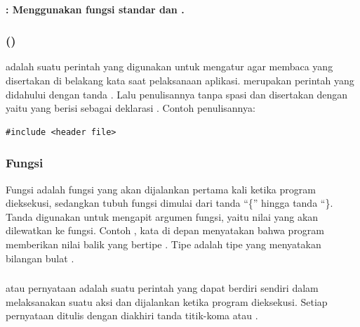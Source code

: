 \documentclass[../main.tex]{subfiles}
\begin{document}
\paragraph{	: Menggunakan fungsi standar {\ioi} dan {\ioo} {\stream}.}

\subsubsection{{\Preprocessor} {\directive} ()}

\begin{indentpar}\hpar{}
    {\Preprocessor} {\directive} adalah suatu perintah yang digunakan untuk mengatur {\compiler} agar membaca {\header} {\file} yang disertakan di belakang kata  saat pelaksanaan aplikasi. {\Preprocessor} {\directive} merupakan perintah yang didahului dengan tanda \citecode{\#}. Lalu penulisannya tanpa spasi dan disertakan dengan {\header} {\file} yaitu {\file} yang berisi sebagai {\file} deklarasi \parencite{kadir2005heriyanto}. Contoh penulisannya:
\end{indentpar}

\begin{code}[n]
\begin{verbatim}
#include <header file>
\end{verbatim}
\end{code}

\subsubsection{Fungsi }
\begin{indentpar}\hpar{}
    Fungsi  adalah fungsi yang akan dijalankan pertama kali ketika program dieksekusi, sedangkan tubuh fungsi dimulai dari tanda “\{” hingga tanda “\}. Tanda \citecode{()} digunakan untuk mengapit argumen fungsi, yaitu nilai yang akan dilewatkan ke fungsi. Contoh , kata  di depan  menyatakan bahwa program memberikan nilai balik yang bertipe . Tipe  adalah tipe yang menyatakan bilangan bulat \parencite{kadir2005heriyanto}.
\end{indentpar}

\subsubsection{{\Statement}}
\begin{indentpar}\hpar{}
    {\Statement} atau pernyataan adalah suatu perintah yang dapat berdiri sendiri dalam melaksanakan suatu aksi dan dijalankan ketika program dieksekusi. Setiap pernyataan ditulis dengan diakhiri tanda titik-koma atau {\semicolon} \citecode{;} \parencite{friyadi2005panduan}.
\end{indentpar}
\end{document}
